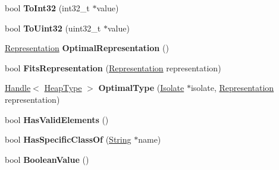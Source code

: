 \begin{DoxyCompactItemize}
\item 
\hypertarget{classv8_1_1internal_1_1_object_a8fa72017bb0c2385165fe2075004b24b}{}bool {\bfseries To\+Int32} (int32\+\_\+t $\ast$value)\label{classv8_1_1internal_1_1_object_a8fa72017bb0c2385165fe2075004b24b}

\item 
\hypertarget{classv8_1_1internal_1_1_object_a3253b6a47805e7e72e2da86a8ebf8a93}{}bool {\bfseries To\+Uint32} (uint32\+\_\+t $\ast$value)\label{classv8_1_1internal_1_1_object_a3253b6a47805e7e72e2da86a8ebf8a93}

\item 
\hypertarget{classv8_1_1internal_1_1_object_a9ceecdf37b8956d4be4eb45db0f3518d}{}\hyperlink{classv8_1_1internal_1_1_representation}{Representation} {\bfseries Optimal\+Representation} ()\label{classv8_1_1internal_1_1_object_a9ceecdf37b8956d4be4eb45db0f3518d}

\item 
\hypertarget{classv8_1_1internal_1_1_object_a73384d8403dda7733708dbfc178f2c66}{}bool {\bfseries Fits\+Representation} (\hyperlink{classv8_1_1internal_1_1_representation}{Representation} representation)\label{classv8_1_1internal_1_1_object_a73384d8403dda7733708dbfc178f2c66}

\item 
\hypertarget{classv8_1_1internal_1_1_object_a11ac63aa890d65b3d21f5ec7e8283a51}{}\hyperlink{classv8_1_1internal_1_1_handle}{Handle}$<$ \hyperlink{classv8_1_1internal_1_1_type_impl}{Heap\+Type} $>$ {\bfseries Optimal\+Type} (\hyperlink{classv8_1_1internal_1_1_isolate}{Isolate} $\ast$isolate, \hyperlink{classv8_1_1internal_1_1_representation}{Representation} representation)\label{classv8_1_1internal_1_1_object_a11ac63aa890d65b3d21f5ec7e8283a51}

\item 
\hypertarget{classv8_1_1internal_1_1_object_a5a4ebd23df8bed6bf2710bc2c8a12958}{}bool {\bfseries Has\+Valid\+Elements} ()\label{classv8_1_1internal_1_1_object_a5a4ebd23df8bed6bf2710bc2c8a12958}

\item 
\hypertarget{classv8_1_1internal_1_1_object_aef4836f5ecda222782061a5d0904615d}{}bool {\bfseries Has\+Specific\+Class\+Of} (\hyperlink{classv8_1_1internal_1_1_string}{String} $\ast$name)\label{classv8_1_1internal_1_1_object_aef4836f5ecda222782061a5d0904615d}

\item 
\hypertarget{classv8_1_1internal_1_1_object_aba5c7479210078aba66186661e30d954}{}bool {\bfseries Boolean\+Value} ()\label{classv8_1_1internal_1_1_object_aba5c7479210078aba66186661e30d954}


\end{DoxyCompactItemize}
